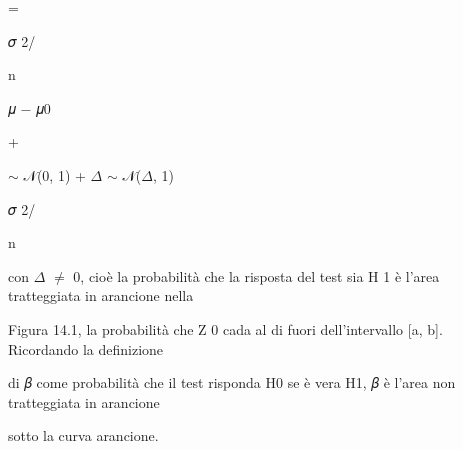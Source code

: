 \documentclass[a4paper,portrait,12pt]{article}
\begin{document}
=





\begin{flushleft}
𝜎 2/
\end{flushleft}


\begin{flushleft}
n
\end{flushleft}





\begin{flushleft}
𝜇 $-$ 𝜇0
\end{flushleft}





+





\begin{flushleft}
$\sim$ 𝒩(0, 1) + $\Delta$ $\sim$ 𝒩($\Delta$, 1)
\end{flushleft}





\begin{flushleft}
𝜎 2/
\end{flushleft}


\begin{flushleft}
n
\end{flushleft}





\begin{flushleft}
con $\Delta$ $\neq$ 0, cio\`{e} la probabilit\`{a} che la risposta del test sia H 1 \`{e} l'area tratteggiata in arancione nella
\end{flushleft}


\begin{flushleft}
Figura 14.1, la probabilit\`{a} che Z 0 cada al di fuori dell'intervallo [a, b]. Ricordando la definizione
\end{flushleft}


\begin{flushleft}
di 𝛽 come probabilit\`{a} che il test risponda H0 se \`{e} vera H1, 𝛽 \`{e} l'area non tratteggiata in arancione
\end{flushleft}


\begin{flushleft}
sotto la curva arancione.
\end{flushleft}
\end{document}
